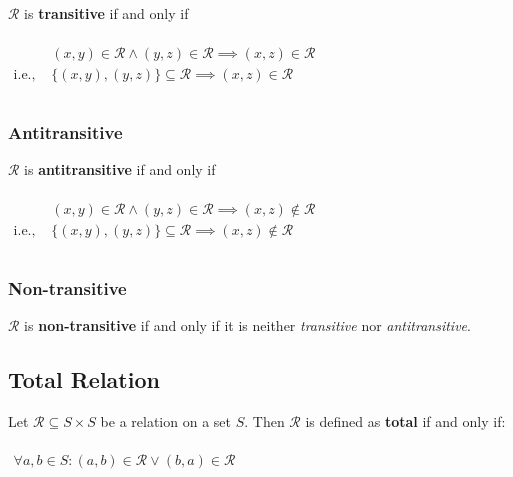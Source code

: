 $\mathcal{R}$ is \textbf{transitive} if and only if

\begin{math}
  \begin{array}{ll}
    \\
    & (x, y) \in \mathcal{R} \land (y, z) \in \mathcal{R} \implies (x, z) \in \mathcal{R}\\
    \text{i.e., } & \{(x, y), (y, z)\} \subseteq \mathcal{R} \implies (x, z) \in \mathcal{R} \\
    \\
  \end{array}
\end{math}


\subsubsection{Antitransitive}

$\mathcal{R}$ is \textbf{antitransitive} if and only if

\begin{math}
  \begin{array}{ll}
    \\
    & (x, y) \in \mathcal{R} \land (y, z) \in \mathcal{R} \implies (x, z) \notin \mathcal{R}\\
    \text{i.e., }& \{ (x, y), (y, z) \} \subseteq \mathcal{R} \implies (x, z) \notin \mathcal{R}\\
    \\
  \end{array}
\end{math}



\subsubsection{Non-transitive}

$\mathcal{R}$ is \textbf{non-transitive} if and only if it is neither
\textit{transitive} nor \textit{antitransitive}.


\subsection{Total Relation}
\label{sec:total-relation}

Let $\mathcal{R} \subseteq S \times S$ be a relation on a set
$S$. Then $\mathcal{R}$ is defined as \textbf{total} if and only if:

\begin{math}
  \begin{array}{c}
    \\
    \forall a, b \in S : (a, b) \in \mathcal{R} \lor (b, a) \in \mathcal{R} \\
    \\
  \end{array}
\end{math}

